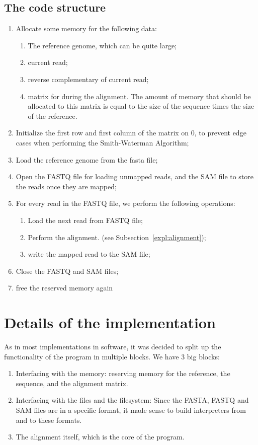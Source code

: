 \subsection{The code structure}

\begin{enumerate}
	\item Allocate some memory for the following data:
	\begin{enumerate}
		\item The reference genome, which can be quite large;
		\item current read;
		\item reverse complementary of current read;
		\item matrix for during the alignment. The amount of memory that should be allocated to this matrix is equal to the size of the sequence times the size of the reference.
	\end{enumerate}
	\item Initialize the first row and first column of the matrix on $0$, to prevent edge cases when performing the Smith-Waterman Algorithm;
	\item Load the reference genome from the fasta file;
	\item Open the FASTQ file for loading unmapped reads, and the SAM file to store the reads once they are mapped;
	\item For every read in the FASTQ file, we perform the following operations:
	\begin{enumerate}
		\item Load the next read from FASTQ file;
		\item Perform the alignment. (see Subsection~\ref{expl:alignment});
		\item write the mapped read to the SAM file;
	\end{enumerate}
	\item Close the FASTQ and SAM files;
	\item free the reserved memory again
\end{enumerate}

\section{Details of the implementation}

As in most implementations in software, it was decided to split up the functionality of the program in multiple blocks. We have 3 big blocks:
\begin{enumerate}
	\item Interfacing with the memory: reserving memory for the reference, the sequence, and the alignment matrix.
	\item Interfacing with the files and the filesystem: Since the FASTA, FASTQ and SAM files are in a specific format, it made sense to build interpreters from and to these formats. 
	\item The alignment itself, which is the core of the program.
\end{enumerate}


